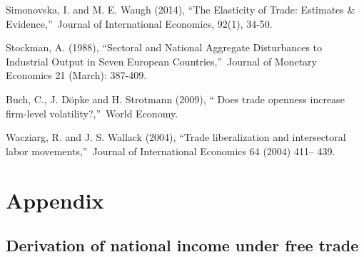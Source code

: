 \documentclass[12pt]{article}
\begin{document}
\begin{thebibliography}{99}
\bibitem{} Simonovska, I. and M. E. Waugh (2014), \textquotedblleft The
Elasticity of Trade: Estimates \& Evidence,\textquotedblright\ Journal of
International Economics, 92(1), 34-50.

\bibitem{} Stockman, A. (1988), \textquotedblleft Sectoral and National
Aggregate Disturbances to Industrial Output in Seven European
Countries,\textquotedblright\ Journal of Monetary Economics 21 (March):
387-409.

\bibitem{} Buch, C., J. D\"{o}pke and H. Strotmann (2009), \textquotedblleft
Does trade openness increase firm-level volatility?,\textquotedblright\
World Economy.

\bibitem{} Wacziarg, R. and J. S. Wallack (2004), \textquotedblleft Trade
liberalization and intersectoral labor movements,\textquotedblright\ Journal
of International Economics 64 (2004) 411-- 439.
\end{thebibliography}

\section*{Appendix}

\subsection*{Derivation of national income under free trade}
\end{document}
